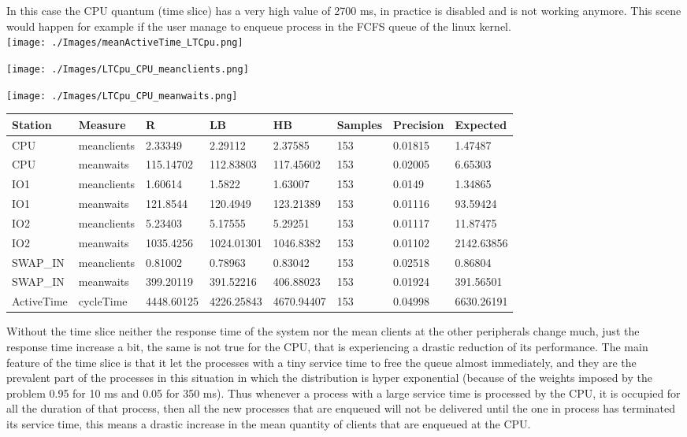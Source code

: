 \documentclass[12pt,a4paper]{article}
\begin{document}
In this case the CPU quantum (time slice) has a very high value of 2700 ms, in practice is disabled and is not working anymore. This scene would happen for example if the user manage to enqueue process in the FCFS queue of the linux kernel.
\\

\texttt{[image: ./Images/meanActiveTime\_LTCpu.png]}


\texttt{[image: ./Images/LTCpu\_CPU\_meanclients.png]}


\texttt{[image: ./Images/LTCpu\_CPU\_meanwaits.png]}


\begin{table}[!ht]
    \centering
    \begin{tabular}{|l|l|l|l|l|l|l|l|}
    \hline
        Station & Measure & R & LB & HB & Samples & Precision & Expected \\ \hline
        CPU & meanclients & 2.33349 & 2.29112 & 2.37585 & 153 & 0.01815 & 1.47487 \\ \hline
        CPU & meanwaits & 115.14702 & 112.83803 & 117.45602 & 153 & 0.02005 & 6.65303 \\ \hline
        IO1 & meanclients & 1.60614 & 1.5822 & 1.63007 & 153 & 0.0149 & 1.34865 \\ \hline
        IO1 & meanwaits & 121.8544 & 120.4949 & 123.21389 & 153 & 0.01116 & 93.59424 \\ \hline
        IO2 & meanclients & 5.23403 & 5.17555 & 5.29251 & 153 & 0.01117 & 11.87475 \\ \hline
        IO2 & meanwaits & 1035.4256 & 1024.01301 & 1046.8382 & 153 & 0.01102 & 2142.63856 \\ \hline
        SWAP\_IN & meanclients & 0.81002 & 0.78963 & 0.83042 & 153 & 0.02518 & 0.86804 \\ \hline
        SWAP\_IN & meanwaits & 399.20119 & 391.52216 & 406.88023 & 153 & 0.01924 & 391.56501 \\ \hline
        ActiveTime & cycleTime & 4448.60125 & 4226.25843 & 4670.94407 & 153 & 0.04998 & 6630.26191 \\ \hline
    \end{tabular}
\end{table}

Without the time slice neither the response time of the system nor the mean clients at the other peripherals change much, just the response time increase a bit, the same is not true for the CPU, that is experiencing a drastic reduction of its performance. The main feature of the time slice is that it let the processes with a tiny service time to free the queue almost immediately, and they are the prevalent part of the processes in this situation in which the distribution is hyper exponential (because of the weights imposed by the problem 0.95 for 10 ms and 0.05 for 350 ms). Thus whenever a process with a large service time is processed by the CPU, it is occupied for all the duration of that process, then all the new processes that are enqueued will not be delivered until the one in process has terminated its service time, this means a drastic increase in the mean quantity of clients that are enqueued at the CPU.
\end{document}
